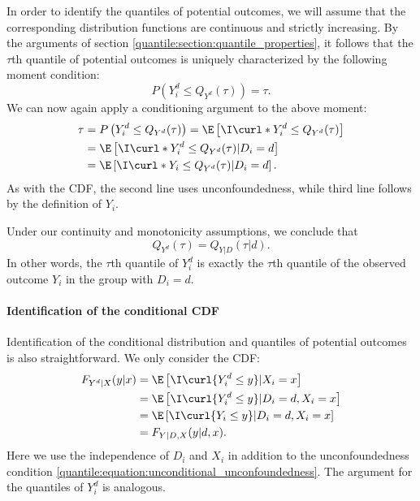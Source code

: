  In order to identify the quantiles of potential outcomes, we will assume that the corresponding distribution functions are continuous and strictly increasing. By the arguments of section \ref{quantile:section:quantile_properties}, it follows that the $\tau$th quantile of potential outcomes is uniquely characterized by the following moment condition:
 \begin{equation}
  P\left(Y^d_i\leq  Q_{Y^d}(\tau)  \right) = 	 \tau  .
 \end{equation}
 We can now again apply a conditioning argument to the above moment:
\begin{align}
	\tau & = P\left(Y^d_i\leq  Q_{Y^d}(\tau)  \right) = \E\left[ \I\curl*{Y^d_i\leq Q_{Y^d}(\tau)} \right] \\
	& = \E\left[\I\curl*{Y^d_i\leq Q_{Y^d}(\tau) }  |D_i=d   \right]\\
	& = \E\left[\I\curl*{Y_i\leq Q_{Y^d}(\tau) }|D_i=d \right].
\end{align}
As with the CDF, the second line uses unconfoundedness, while third line follows by the definition of $Y_i$.

Under our continuity and monotonicity assumptions, we conclude that 
\begin{equation}
	 Q_{Y^d}(\tau) = Q_{Y|D}(\tau|d).
\end{equation} 
In other words, the $\tau$th quantile of $Y^d_i$ is exactly the $\tau$th quantile of the observed outcome $Y_i$ in the group with $D_i=d$. 
 
 
\paragraph{Identification of the conditional CDF}
 
 Identification of the conditional distribution and quantiles of potential outcomes is also straightforward. We only consider the CDF:
 \begin{align}
 	F_{Y^d|X}(y|x) & = \E\left[ \I\curl{Y^d_i\leq y}|X_i=x \right] \\
 	& = \E\left[ \I\curl{Y^d_i\leq y} |D_i=d, X_i=x \right]\\
 	& = \E\left[ \I\curl{Y_i\leq y}|D_i=d, X_i=x \right]\\
 	& = F_{Y|D, X}(y|d, x).
 \end{align}
  Here we use the independence of $D_i$ and $X_i$ in addition to the unconfoundedness condition \eqref{quantile:equation:unconditional_unconfoundedness}. The argument for the quantiles of $Y^d_i$ is analogous. 
   
